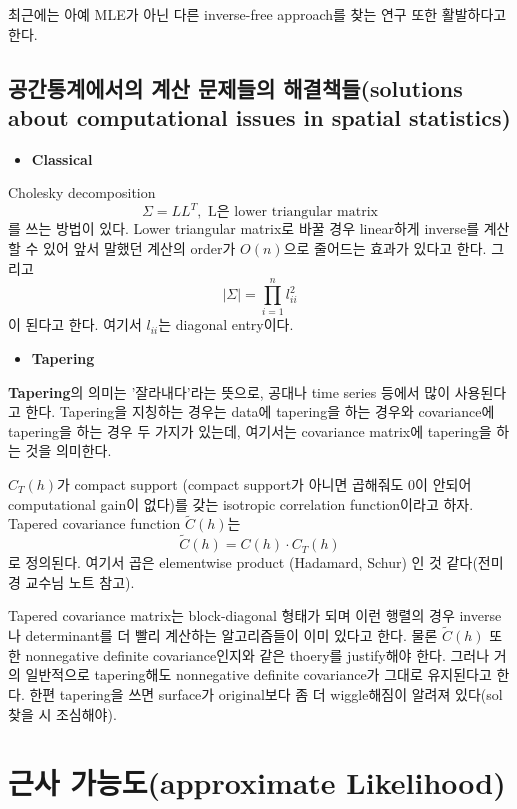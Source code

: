 \documentclass[b5paper,]{scrbook}
\providecommand{\tightlist}{%
  \setlength{\itemsep}{0pt}\setlength{\parskip}{0pt}}
\theoremstyle{plain}
\theoremstyle{definition}
\numberwithin{equation}{section}
\begin{document}
최근에는 아예 MLE가 아닌 다른 inverse-free approach를 찾는 연구 또한
활발하다고 한다.

\subsection{공간통계에서의 계산 문제들의 해결책들(solutions about
computational issues in spatial
statistics)}\label{---solutions-about-computational-issues-in-spatial-statistics}

\begin{itemize}
\tightlist
\item
  \textbf{Classical}
\end{itemize}

Cholesky decomposition
\[\Sigma=LL^{T}, \text{ L은 lower triangular matrix}\] 를 쓰는 방법이
있다. Lower triangular matrix로 바꿀 경우 linear하게 inverse를 계산할 수
있어 앞서 말했던 계산의 order가 \(O(n)\)으로 줄어드는 효과가 있다고
한다. 그리고 \[|\Sigma | = \prod_{i=1}^{n}l_{ii}^{2}\] 이 된다고 한다.
여기서 \(l_{ii}\)는 diagonal entry이다.

\begin{itemize}
\tightlist
\item
  \textbf{Tapering}
\end{itemize}

\textbf{Tapering}의 의미는 '잘라내다'라는 뜻으로, 공대나 time series
등에서 많이 사용된다고 한다. Tapering을 지칭하는 경우는 data에
tapering을 하는 경우와 covariance에 tapering을 하는 경우 두 가지가
있는데, 여기서는 covariance matrix에 tapering을 하는 것을 의미한다.

\(C_{T}(h)\)가 compact support (compact support가 아니면 곱해줘도 0이
안되어 computational gain이 없다)를 갖는 isotropic correlation
function이라고 하자. Tapered covariance function \(\tilde{C}(h)\)는
\[\tilde{C}(h)=C(h)\cdot C_{T}(h)\] 로 정의된다. 여기서 곱은 elementwise
product (Hadamard, Schur) 인 것 같다(전미경 교수님 노트 참고).

Tapered covariance matrix는 block-diagonal 형태가 되며 이런 행렬의 경우
inverse나 determinant를 더 빨리 계산하는 알고리즘들이 이미 있다고 한다.
물론 \(\tilde{C}(h)\) 또한 nonnegative definite covariance인지와 같은
thoery를 justify해야 한다. 그러나 거의 일반적으로 tapering해도
nonnegative definite covariance가 그대로 유지된다고 한다. 한편
tapering을 쓰면 surface가 original보다 좀 더 wiggle해짐이 알려져
있다(sol 찾을 시 조심해야).

\section{근사 가능도(approximate
Likelihood)}\label{-approximate-likelihood}
\end{document}
